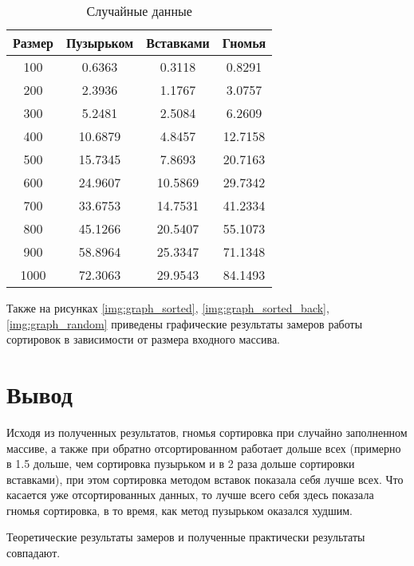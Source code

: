\begin{table}[h]
	\begin{center}
		\begin{threeparttable}
		\captionsetup{justification=raggedright,singlelinecheck=off}
		\caption{Случайные данные}
		\label{tbl:random}
		\begin{tabular}{|c|c|c|c|}
			\hline
			 Размер & Пузырьком &  Вставками &  Гномья \\
			\hline
			100 & 0.6363 & 0.3118 & 0.8291 \\ 
			\hline
			200 & 2.3936 & 1.1767 & 3.0757 \\ 
			\hline
			300 & 5.2481 & 2.5084 & 6.2609 \\ 
			\hline
			400 & 10.6879 & 4.8457 & 12.7158 \\ 
			\hline
			500 & 15.7345 & 7.8693 & 20.7163 \\ 
			\hline
			600 & 24.9607 & 10.5869 & 29.7342 \\ 
			\hline
			700 & 33.6753 & 14.7531 & 41.2334 \\ 
			\hline
			800 & 45.1266 & 20.5407 & 55.1073 \\ 
			\hline
			900 & 58.8964 & 25.3347 & 71.1348 \\ 
			\hline
			1000 & 72.3063 & 29.9543 & 84.1493 \\ 
			\hline
		\end{tabular}
		\end{threeparttable}
    \end{center}
\end{table}


Также на рисунках \ref{img:graph_sorted}, \ref{img:graph_sorted_back}, \ref{img:graph_random} приведены графические результаты замеров работы сортировок в зависимости от размера входного массива.


\clearpage

\section*{Вывод}
Исходя из полученных результатов, гномья сортировка при случайно заполненном массиве, а также при обратно отсортированном работает дольше всех (примерно в 1.5 дольше, чем сортировка пузырьком и в 2 раза дольше сортировки вставками), при этом сортировка методом вставок показала себя лучше всех. Что касается уже отсортированных данных, то лучше всего себя здесь показала гномья сортировка, в то время, как метод пузырьком оказался худшим.

Теоретические результаты замеров и полученные практически результаты совпадают.